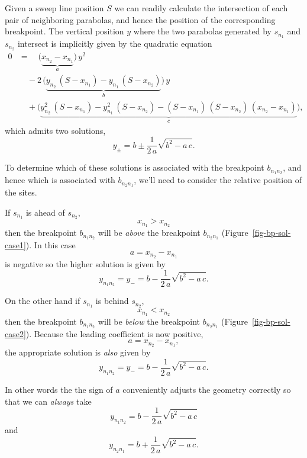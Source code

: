 \documentclass[
  letterpaper,
  DIV=11,
  numbers=noendperiod]{scrartcl}
\begin{document}
Given a sweep line position \(S\) we can readily calculate the
intersection of each pair of neighboring parabolas, and hence the
position of the corresponding breakpoint. The vertical position \(y\)
where the two parabolas generated by \(s_{n_{1}}\) and \(s_{n_{2}}\)
intersect is implicitly given by the quadratic equation \begin{align*}
0
&=\quad
\Bigg( \underbrace{ x_{n_{2}} - x_{n_{1}} }_{a} \Bigg) \,
y^{2}
\\
&\quad
-2 \,
\Bigg(  \underbrace{    y_{n_{2}} \, (S - x_{n_{1}})
                      - y_{n_{1}} \, (S - x_{n_{2}}) }_{b} \Bigg) \,
y
\\
&\quad
+
\Bigg(  \underbrace{   y_{n_{2}}^{2} \, (S - x_{n_{1}})
                     - y_{n_{1}}^{2} \, (S - x_{n_{2}})
                     - (S - x_{n_{1}}) \,
                       (S - x_{n_{2}}) \,
                       (x_{n_{2}} - x_{n_{1}} ) }_{c}
\Bigg),
\end{align*} which admits two solutions, \[
y_{\pm} = b \pm \frac{1}{2 \, a} \sqrt{ b^{2} - a \, c }.
\]

To determine which of these solutions is associated with the breakpoint
\(b_{n_{1}n_{2}}\), and hence which is associated with
\(b_{n_{2}n_{1}}\), we'll need to consider the relative position of the
sites.

If \(s_{n_{1}}\) is ahead of \(s_{n_{2}}\), \[
x_{n_{1}} > x_{n_{2}}
\] then the breakpoint \(b_{n_{1}n_{2}}\) will be \emph{above} the
breakpoint \(b_{n_{2}n_{1}}\) (Figure~\ref{fig-bp-sol-case1}). In this
case \[
a = x_{n_{2}} - x_{n_{1}}
\] is negative so the higher solution is given by \[
y_{n_{1}n_{2}}
=
y_{-}
=
b - \frac{1}{2 \, a} \sqrt{ b^{2} - a \, c }.
\]

On the other hand if \(s_{n_{1}}\) is behind \(s_{n_{2}}\), \[
x_{n_{1}} < x_{n_{2}}
\] then the breakpoint \(b_{n_{1}n_{2}}\) will be \emph{below} the
breakpoint \(b_{n_{2}n_{1}}\) (Figure~\ref{fig-bp-sol-case2}). Because
the leading coefficient is now positive, \[
a = x_{n_{2}} - x_{n_{1}},
\] the appropriate solution is \emph{also} given by \[
y_{n_{1}n_{2}}
=
y_{-}
=
b - \frac{1}{2 \, a} \sqrt{ b^{2} - a \, c }.
\]

In other words the the sign of \(a\) conveniently adjusts the geometry
correctly so that we can \emph{always} take \[
y_{n_{1}n_{2}}
=
b - \frac{1}{2 \, a} \sqrt{ b^{2} - a \, c }
\] and \[
y_{n_{2}n_{1}}
=
b + \frac{1}{2 \, a} \sqrt{ b^{2} - a \, c }.
\]
\end{document}
